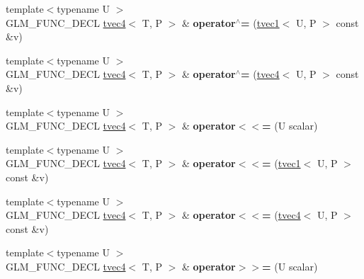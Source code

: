 \begin{DoxyCompactItemize}
{\footnotesize template$<$typename U $>$ }\\G\+L\+M\+\_\+\+F\+U\+N\+C\+\_\+\+D\+E\+CL \hyperlink{structglm_1_1tvec4}{tvec4}$<$ T, P $>$ \& {\bfseries operator$^\wedge$=} (\hyperlink{structglm_1_1tvec1}{tvec1}$<$ U, P $>$ const \&v)
\item 
\mbox{\label{structglm_1_1tvec4_a9945b7771ada85b3324781679d9282f5}} 
{\footnotesize template$<$typename U $>$ }\\G\+L\+M\+\_\+\+F\+U\+N\+C\+\_\+\+D\+E\+CL \hyperlink{structglm_1_1tvec4}{tvec4}$<$ T, P $>$ \& {\bfseries operator$^\wedge$=} (\hyperlink{structglm_1_1tvec4}{tvec4}$<$ U, P $>$ const \&v)
\item 
\mbox{\label{structglm_1_1tvec4_a7896c5f2fbb9692e18f145fef2482677}} 
{\footnotesize template$<$typename U $>$ }\\G\+L\+M\+\_\+\+F\+U\+N\+C\+\_\+\+D\+E\+CL \hyperlink{structglm_1_1tvec4}{tvec4}$<$ T, P $>$ \& {\bfseries operator$<$$<$=} (U scalar)
\item 
\mbox{\label{structglm_1_1tvec4_a499b2a24166487f91833e1f6b19aa972}} 
{\footnotesize template$<$typename U $>$ }\\G\+L\+M\+\_\+\+F\+U\+N\+C\+\_\+\+D\+E\+CL \hyperlink{structglm_1_1tvec4}{tvec4}$<$ T, P $>$ \& {\bfseries operator$<$$<$=} (\hyperlink{structglm_1_1tvec1}{tvec1}$<$ U, P $>$ const \&v)
\item 
\mbox{\label{structglm_1_1tvec4_ae46c24a5c1f5c2bcbcb9f4d9c767778e}} 
{\footnotesize template$<$typename U $>$ }\\G\+L\+M\+\_\+\+F\+U\+N\+C\+\_\+\+D\+E\+CL \hyperlink{structglm_1_1tvec4}{tvec4}$<$ T, P $>$ \& {\bfseries operator$<$$<$=} (\hyperlink{structglm_1_1tvec4}{tvec4}$<$ U, P $>$ const \&v)
\item 
\mbox{\label{structglm_1_1tvec4_a6864c1240c7b96bc2ece0dca52eeaa78}} 
{\footnotesize template$<$typename U $>$ }\\G\+L\+M\+\_\+\+F\+U\+N\+C\+\_\+\+D\+E\+CL \hyperlink{structglm_1_1tvec4}{tvec4}$<$ T, P $>$ \& {\bfseries operator$>$$>$=} (U scalar)
\item 
\mbox{\label{structglm_1_1tvec4_a941c7db66248a949a46e398b8f9f15ce}} 

\end{DoxyCompactItemize}
